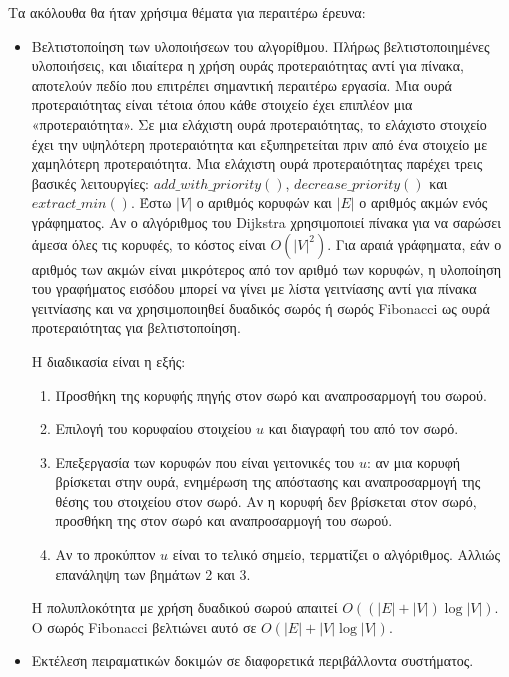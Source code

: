 \documentclass[12pt,a4paper]{article}
\begin{document}
Τα ακόλουθα θα ήταν χρήσιμα θέματα για περαιτέρω έρευνα:
\begin{itemize}
\item Βελτιστοποίηση των υλοποιήσεων του αλγορίθμου. Πλήρως βελτιστοποιημένες υλοποιήσεις, και ιδιαίτερα η χρήση ουράς προτεραιότητας αντί για πίνακα, αποτελούν πεδίο που επιτρέπει σημαντική περαιτέρω εργασία. Μια ουρά προτεραιότητας είναι τέτοια όπου κάθε στοιχείο έχει επιπλέον μια «προτεραιότητα». Σε μια ελάχιστη ουρά προτεραιότητας, το ελάχιστο στοιχείο έχει την υψηλότερη προτεραιότητα και εξυπηρετείται πριν από ένα στοιχείο με χαμηλότερη προτεραιότητα. Μια ελάχιστη ουρά προτεραιότητας παρέχει τρεις βασικές λειτουργίες: \texttt{$add\_with\_priority()$}, \texttt{$decrease\_priority()$} και \texttt{$extract\_min()$}. Έστω $|V|$ ο αριθμός κορυφών και $|E|$ ο αριθμός ακμών ενός γράφηματος. Αν ο αλγόριθμος του \foreignlanguage{english}{Dijkstra} χρησιμοποιεί πίνακα για να σαρώσει άμεσα όλες τις κορυφές, το κόστος είναι $O(|V|^{2})$. Για αραιά γράφηματα, εάν ο αριθμός των ακμών είναι μικρότερος από τον αριθμό των κορυφών, η υλοποίηση του γραφήματος εισόδου μπορεί να γίνει με λίστα γειτνίασης αντί για πίνακα γειτνίασης και να χρησιμοποιηθεί δυαδικός σωρός ή σωρός \foreignlanguage{english}{Fibonacci} ως ουρά προτεραιότητας για βελτιστοποίηση.

Η διαδικασία είναι η εξής:
    \begin{enumerate}
    \item Προσθήκη της κορυφής πηγής στον σωρό και αναπροσαρμογή του σωρού.
    \item Επιλογή του κορυφαίου στοιχείου $u$ και διαγραφή του από τον σωρό.
    \item Επεξεργασία των κορυφών που είναι γειτονικές του $u$: αν μια κορυφή βρίσκεται στην ουρά, ενημέρωση της απόστασης και αναπροσαρμογή της θέσης του στοιχείου στον σωρό. Αν η κορυφή δεν βρίσκεται στον σωρό, προσθήκη της στον σωρό και αναπροσαρμογή του σωρού.
    \item Αν το προκύπτον $u$ είναι το τελικό σημείο, τερματίζει ο αλγόριθμος. Αλλιώς επανάληψη των βημάτων 2 και 3.
    \end{enumerate}
    Η πολυπλοκότητα με χρήση δυαδικού σωρού απαιτεί $O((|E|+|V|)\log|V|)$. Ο σωρός \foreignlanguage{english}{Fibonacci} βελτιώνει αυτό σε $O(|E| + |V|\log|V|)$.

\item Εκτέλεση πειραματικών δοκιμών σε διαφορετικά περιβάλλοντα συστήματος.
\end{itemize}
\end{document}
